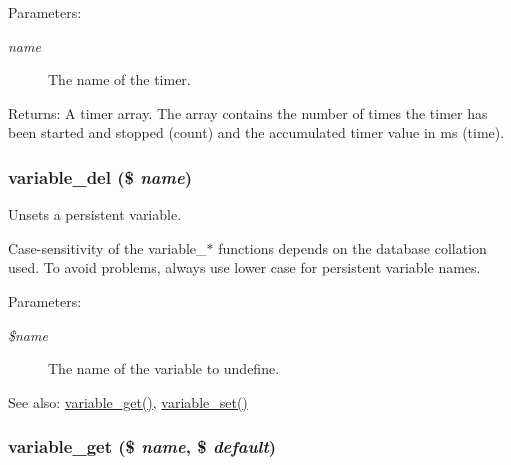 \begin{Desc}
\item[Parameters:]
\begin{description}
\item[{\em name}]The name of the timer. \end{description}
\end{Desc}
\begin{Desc}
\item[Returns:]A timer array. The array contains the number of times the timer has been started and stopped (count) and the accumulated timer value in ms (time). \end{Desc}
\hypertarget{bootstrap_8inc_7850bff5f313f85335f418e6d87606b1}{
\subsubsection[{variable\_\-del}]{\setlength{\rightskip}{0pt plus 5cm}variable\_\-del (\$ {\em name})}}
\label{bootstrap_8inc_7850bff5f313f85335f418e6d87606b1}


Unsets a persistent variable.

Case-sensitivity of the variable\_\-$\ast$ functions depends on the database collation used. To avoid problems, always use lower case for persistent variable names.

\begin{Desc}
\item[Parameters:]
\begin{description}
\item[{\em \$name}]The name of the variable to undefine.\end{description}
\end{Desc}
\begin{Desc}
\item[See also:]\hyperlink{bootstrap_8inc_ba5d67193d1f9d9fd4636cff54fc4154}{variable\_\-get()}, \hyperlink{bootstrap_8inc_9859faa6fcd56ca6048be93dace95999}{variable\_\-set()} \end{Desc}
\hypertarget{bootstrap_8inc_ba5d67193d1f9d9fd4636cff54fc4154}{
\subsubsection[{variable\_\-get}]{\setlength{\rightskip}{0pt plus 5cm}variable\_\-get (\$ {\em name}, \/  \$ {\em default})}}
\label{bootstrap_8inc_ba5d67193d1f9d9fd4636cff54fc4154}


